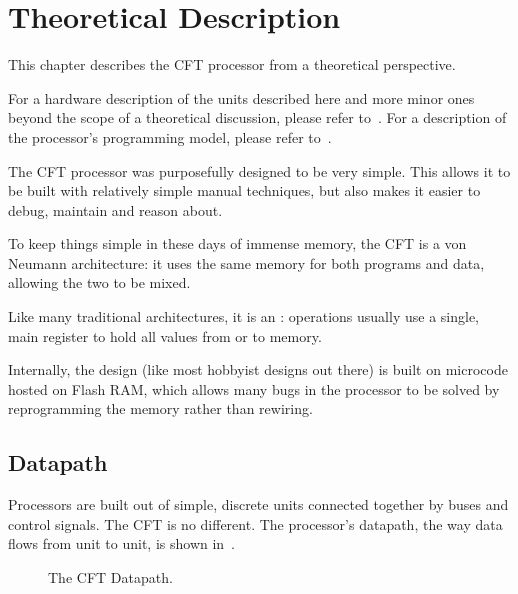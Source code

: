 \chapter{Theoretical Description}

This chapter describes the CFT processor from a theoretical
perspective.

For a hardware description of the units described here and more minor ones
beyond the scope of a theoretical discussion, please refer
to~. For a description of the
processor's programming model, please refer to~.

The CFT processor was purposefully designed to be very simple. This
allows it to be built with relatively simple manual techniques, but
also makes it easier to debug, maintain and reason about.

To keep things simple in these days of immense memory, the CFT is a
\gls{von Neumann architecture}: it uses the same memory for both
programs and data, allowing the two to be mixed.

Like many traditional architectures, it is an : operations
usually use a single, main register to hold all values from or to
memory.

Internally, the design (like most hobbyist designs out there) is built
on microcode hosted on Flash RAM, which allows many bugs in the
processor to be solved by reprogramming the memory rather than
rewiring.

\section{Datapath}

Processors are built out of simple, discrete units connected together
by buses and control signals. The CFT is no different. The processor's
datapath, the way data flows from unit to unit, is shown
in~.

\begin{figure}
\caption[CFT Datapath]{\label{fig:datapath} The CFT Datapath. }
\end{figure}

